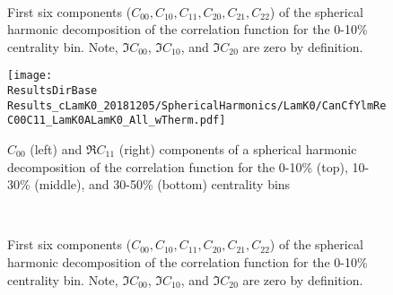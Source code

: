 \documentclass[/home/jesse/Analysis/FemtoAnalysis/AnalysisNotes/AnalysisNoteJBuxton.tex]{subfiles}
\begin{document}
\begin{figure}[h!]
  \centering
   \\
  \caption[\LamKchM First Six Components of Spherical Harmonic Decomposition (0-10\%)]{First six components ($C_{00}, C_{10}, C_{11}, C_{20}, C_{21}, C_{22}$) of the spherical harmonic decomposition of the \LamKchM correlation function for the 0-10\% centrality bin.
  Note, $\Im C_{00}$, $\Im C_{10}$, and $\Im C_{20}$ are zero by definition.}
  \label{fig:LamKchM_FirstSixCYlm}
\end{figure}













\begin{figure}[h]
  \centering
  \texttt{[image: \\ResultsDirBase Results\_cLamK0\_20181205/SphericalHarmonics/LamK0/CanCfYlmReC00C11\_LamK0ALamK0\_All\_wTherm.pdf]}
  \caption[\LamKs $C_{00}$ and $\Re C_{11}$ Spherical Harmonic Components]{$C_{00}$ (left) and $\Re C_{11}$ (right) components of a spherical harmonic decomposition of the \LamKs correlation function for the 0-10\% (top), 10-30\% (middle), and 30-50\% (bottom) centrality bins}
  \label{fig:LamK0_ReC00C11_All}
\end{figure}



\begin{figure}[h!]
  \centering
   \\
  \caption[\LamKs First Six Components of Spherical Harmonic Decomposition (0-10\%)]{First six components ($C_{00}, C_{10}, C_{11}, C_{20}, C_{21}, C_{22}$) of the spherical harmonic decomposition of the \LamKs correlation function for the 0-10\% centrality bin.
  Note, $\Im C_{00}$, $\Im C_{10}$, and $\Im C_{20}$ are zero by definition.}
  \label{fig:LamK0_FirstSixCYlm}
\end{figure}

\clearpage
\end{document}
